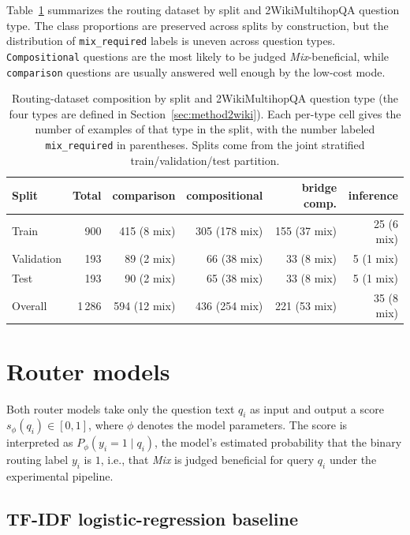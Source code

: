 \documentclass[english, bibtex]{kththesis}               %
\numberwithin{listing}{chapter}
\begin{document}
Table~\ref{tab:datasetSummary} summarizes the routing dataset by split and 2WikiMultihopQA question type. The class proportions are preserved across splits by construction, but the distribution of \texttt{mix\_required} labels is uneven across question types. \texttt{Compositional} questions are the most likely to be judged \emph{Mix}-beneficial, while \texttt{comparison} questions are usually answered well enough by the low-cost mode.

\begin{table}[!ht]
\begin{center}
\caption{Routing-dataset composition by split and 2WikiMultihopQA question type (the four types are defined in Section~\ref{sec:method2wiki}). Each per-type cell gives the number of examples of that type in the split, with the number labeled \texttt{mix\_required} in parentheses. Splits come from the joint stratified train/validation/test partition.}
\label{tab:datasetSummary}
\footnotesize
\setlength{\tabcolsep}{3pt}
\begin{tabular}{l|r|rrrr}
\textbf{Split} & \textbf{Total} & \textbf{comparison} & \textbf{compositional} & \textbf{bridge comp.} & \textbf{inference} \\
\hline
Train & 900 & 415 (8 mix) & 305 (178 mix) & 155 (37 mix) & 25 (6 mix) \\
Validation & 193 & 89 (2 mix) & 66 (38 mix) & 33 (8 mix) & 5 (1 mix) \\
Test & 193 & 90 (2 mix) & 65 (38 mix) & 33 (8 mix) & 5 (1 mix) \\
\hline
Overall & 1\,286 & 594 (12 mix) & 436 (254 mix) & 221 (53 mix) & 35 (8 mix) \\
\end{tabular}
\end{center}
\end{table}

\section{Router models}
\label{sec:methodRouters}

Both router models take only the question text $q_i$ as input and output a score \(s_\phi(q_i) \in [0,1]\), where $\phi$ denotes the model parameters. The score is interpreted as $P_\phi(y_i = 1 \mid q_i)$, the model's estimated probability that the binary routing label $y_i$ is $1$, i.e., that \emph{Mix} is judged beneficial for query $q_i$ under the experimental pipeline.

\subsection{TF-IDF logistic-regression baseline}
\label{sec:methodTfidf}
\end{document}
